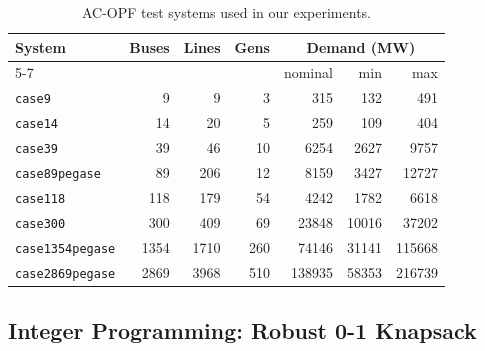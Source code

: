 \documentclass[10pt]{article} %
\theoremstyle{plain}
\theoremstyle{definition}
\theoremstyle{remark}
\begin{document}
\begin{table}[t]
\centering
\caption{AC-OPF test systems used in our experiments.}
\label{tab:acopf-cases}
\begin{tabular}{l rrr rrr}
\toprule
System & Buses & Lines & Gens & \multicolumn{3}{c}{Demand (MW)} \\
\cmidrule(lr){5-7}
 & & & & nominal & min & max \\
\midrule
\texttt{case9} & 9 & 9 & 3 & 315 & 132 & 491 \\
\texttt{case14} & 14 & 20 & 5 & 259 & 109 & 404 \\
\texttt{case39} & 39 & 46 & 10 & 6254 & 2627 & 9757 \\
\texttt{case89pegase} & 89 & 206 & 12 & 8159 & 3427 & 12727 \\
\texttt{case118} & 118 & 179 & 54 & 4242 & 1782 & 6618 \\
\texttt{case300} & 300 & 409 & 69 & 23848 & 10016 & 37202 \\
\texttt{case1354pegase} & 1354 & 1710 & 260 & 74146 & 31141 & 115668 \\
\texttt{case2869pegase} & 2869 & 3968 & 510 & 138935 & 58353 & 216739 \\
\bottomrule
\end{tabular}
\end{table}

\subsection{Integer Programming: Robust 0-1 Knapsack}
\end{document}

